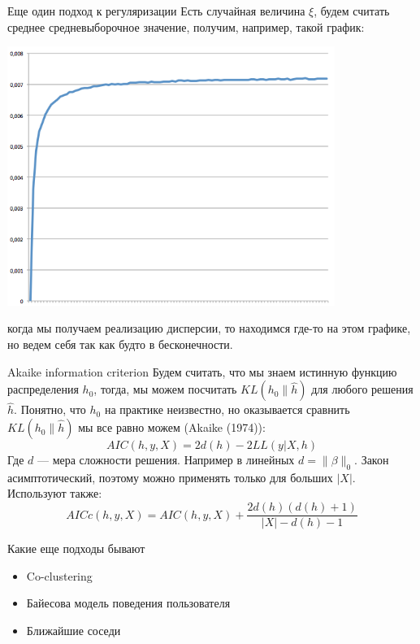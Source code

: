 \documentclass[14pt, fleqn, xcolor={dvipsnames, table}]{beamer}
\begin{document}
\begin{frame}{Еще один подход к регуляризации}
\small
Есть случайная величина $\xi$, будем считать среднее средневыборочное значение, получим, например, такой график:
\begin{center}
\includegraphics[height=0.5\textheight, width=0.8\textwidth]{D.png}
\end{center}
когда мы получаем реализацию дисперсии, то находимся где-то на этом графике, но ведем себя так как будто в бесконечности.
\end{frame}

\begin{frame}{Akaike information criterion}
\small
Будем считать, что мы знаем истинную функцию распределения $h_0$, тогда, мы можем посчитать $KL(h_0 \| \hat{h})$ для любого решения $\hat{h}$. Понятно, что $h_0$ на практике неизвестно, но оказывается сравнить $KL(h_0 \| \hat{h})$ мы все равно можем (Akaike (1974)):
$$AIC(h, y, X) = 2d(h) - 2 LL(y|X,h)$$
Где $d$ --- мера сложности решения. Например в линейных $d = \|\beta\|_0$. Закон асимптотический, поэтому можно применять только для больших $|X|$. Используют также:
$$
AICc(h, y, X) = AIC(h,y,X) + \frac{2d(h)(d(h) + 1)}{|X| - d(h) - 1}
$$
\end{frame}

\begin{frame}{Какие еще подходы бывают}
\begin{itemize}
  \item Co-clustering
  \item Байесова модель поведения пользователя
  \item Ближайшие соседи  
\end{itemize}
\end{frame}
\end{document}
